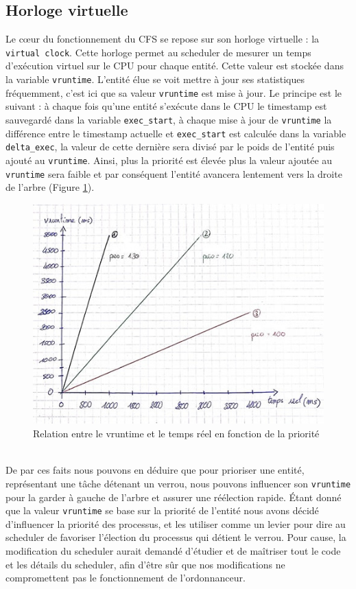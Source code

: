 \subsection{Horloge virtuelle}
Le cœur du fonctionnement du CFS se repose sur son horloge virtuelle : la
\verb|virtual clock|. Cette horloge permet au scheduler de mesurer un temps
d'exécution virtuel sur le CPU pour chaque entité. Cette valeur est stockée dans
la variable \verb|vruntime|. L'entité élue se voit mettre à jour ses statistiques
fréquemment, c'est ici que sa valeur \verb|vruntime| est mise à jour. Le
principe est le suivant : à chaque fois qu'une entité s'exécute dans le CPU le
timestamp est sauvegardé dans la variable \verb|exec_start|, à chaque mise à
jour de \verb|vruntime| la différence entre le timestamp actuelle et
\verb|exec_start| est calculée dans la variable \verb|delta_exec|, la valeur de
cette dernière sera divisé par le poids de l'entité puis ajouté au
\verb|vruntime|. Ainsi, plus la priorité est élevée plus la valeur ajoutée au
\verb|vruntime| sera faible et par conséquent l'entité avancera lentement vers
la droite de l'arbre (Figure \ref{fig:sched}).
\begin{figure}[h!]
	\centering
	\includegraphics[scale=2.5]{include/schema_sched.jpg}
	\caption{Relation entre le vruntime et le temps réel en fonction de la priorité}
	\label{fig:sched}
\end{figure}
\\

De par ces faits nous pouvons en déduire que pour prioriser une entité, 
représentant une tâche détenant un verrou, nous pouvons influencer son 
\verb|vruntime| pour la garder à gauche de l'arbre et assurer une réélection 
rapide. Étant donné que la valeur \verb|vruntime| se base sur la priorité de 
l'entité nous avons décidé d'influencer la priorité des processus, et 
les utiliser comme un levier pour dire au scheduler de favoriser l'élection 
du processus qui détient le verrou. Pour cause, la modification du scheduler aurait
demandé d'étudier et de maîtriser tout le code et les détails du scheduler, afin
d'être sûr que nos modifications ne compromettent pas le fonctionnement de
l'ordonnanceur.